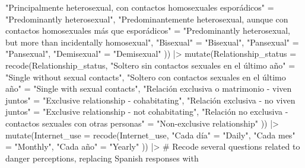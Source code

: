 \documentclass[
  bookmarksnumbered]{article}
\newenvironment{Shaded}{\begin{snugshade}}{\end{snugshade}}
\newcommand{\AttributeTok}[1]{\textcolor[rgb]{0.80,0.80,0.80}{#1}}
\newcommand{\CommentTok}[1]{\textcolor[rgb]{0.50,0.62,0.50}{#1}}
\newcommand{\FunctionTok}[1]{\textcolor[rgb]{0.94,0.94,0.56}{#1}}
\newcommand{\NormalTok}[1]{\textcolor[rgb]{0.80,0.80,0.80}{#1}}
\newcommand{\OtherTok}[1]{\textcolor[rgb]{0.94,0.94,0.56}{#1}}
\newcommand{\SpecialCharTok}[1]{\textcolor[rgb]{0.86,0.64,0.64}{#1}}
\newcommand{\StringTok}[1]{\textcolor[rgb]{0.80,0.58,0.58}{#1}}
\begin{document}
\begin{Shaded}
\begin{Highlighting}[]
                                     \StringTok{"Principalmente heterosexual, con contactos homosexuales esporádicos"} \OtherTok{=}
                                       \StringTok{"Predominantly heterosexual"}\NormalTok{,}
                                     \StringTok{"Predominantemente heterosexual, aunque con contactos homosexuales más que esporádicos"} \OtherTok{=}
                                       \StringTok{"Predominantly heterosexual, but more than incidentally homosexual"}\NormalTok{,}
                                     \StringTok{"Bisexual"} \OtherTok{=} \StringTok{"Bisexual"}\NormalTok{,}
                                     \StringTok{"Pansexual"} \OtherTok{=} \StringTok{"Pansexual"}\NormalTok{,}
                                     \StringTok{"Demisexual"} \OtherTok{=} \StringTok{"Demisexual"}
\NormalTok{  )) }\SpecialCharTok{|\textgreater{}}
  \FunctionTok{mutate}\NormalTok{(}\AttributeTok{Relationship\_status =} \FunctionTok{recode}\NormalTok{(Relationship\_status,}
                                      \StringTok{"Soltero sin contactos sexuales en el último año"} \OtherTok{=}
                                        \StringTok{"Single without sexual contacts"}\NormalTok{,}
                                      \StringTok{"Soltero con contactos sexuales en el último año"} \OtherTok{=}
                                        \StringTok{"Single with sexual contacts"}\NormalTok{,}
                                      \StringTok{"Relación exclusiva o matrimonio {-} viven juntos"} \OtherTok{=}
                                        \StringTok{"Exclusive relationship {-} cohabitating"}\NormalTok{,}
                                      \StringTok{"Relación exclusiva {-} no viven juntos"} \OtherTok{=}
                                        \StringTok{"Exclusive relationship {-} not cohabitating"}\NormalTok{,}
                                      \StringTok{"Relación no exclusiva {-} contactos sexuales con otras personas"} \OtherTok{=}
                                        \StringTok{"Non{-}exclusive relationship"}
\NormalTok{  )) }\SpecialCharTok{|\textgreater{}}
  \FunctionTok{mutate}\NormalTok{(}\AttributeTok{Internet\_use =} \FunctionTok{recode}\NormalTok{(Internet\_use,}
                               \StringTok{"Cada día"} \OtherTok{=} \StringTok{"Daily"}\NormalTok{,}
                               \StringTok{"Cada mes"} \OtherTok{=} \StringTok{"Monthly"}\NormalTok{,}
                               \StringTok{"Cada año"} \OtherTok{=} \StringTok{"Yearly"}
\NormalTok{  )) }\SpecialCharTok{|\textgreater{}}
  \CommentTok{\# Recode several questions related to danger perceptions, replacing Spanish responses with}

\end{Highlighting}
\end{Shaded}
\end{document}
